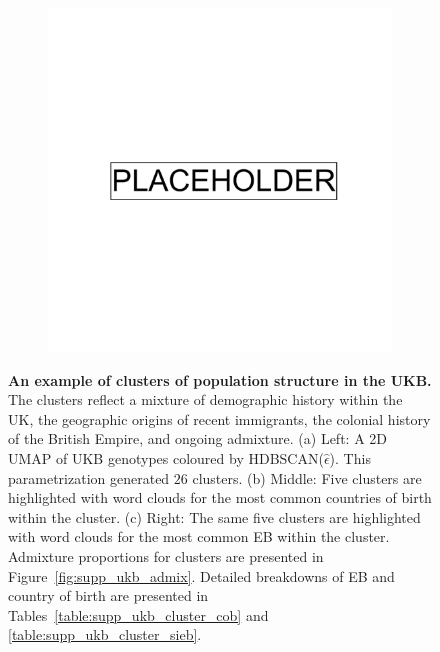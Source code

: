 \begin{figure}[ht]
\begin{subfigure}[b]{0.3\linewidth}
    \caption{}
    \label{fig:ukb_hdbscan_labels_cob}
  \end{subfigure}
     \begin{subfigure}[b]{0.3\linewidth}
\includegraphics[width=\linewidth]{placeholder.png}
    \caption{}
    \label{fig:ukb_hdbscan_labels_eth}
  \end{subfigure}
  \caption[Clusters of population structure in the UKB]{\textbf{An example of clusters of population structure in the UKB.} The clusters reflect a mixture of demographic history within the UK, the geographic origins of recent immigrants, the colonial history of the British Empire, and ongoing admixture. (a) Left: A 2D UMAP of UKB genotypes coloured by HDBSCAN($\hat{\epsilon}$). This parametrization generated $26$ clusters. (b) Middle: Five clusters are highlighted with word clouds for the most common countries of birth within the cluster. (c) Right: The same five clusters are highlighted with word clouds for the most common EB within the cluster. Admixture proportions for clusters are presented in Figure~\ref{fig:supp_ukb_admix}. Detailed breakdowns of EB and country of birth are presented in Tables~\ref{table:supp_ukb_cluster_cob} and \ref{table:supp_ukb_cluster_sieb}.}
  \label{fig:ukb_hdbscan_compare}
\end{figure}

